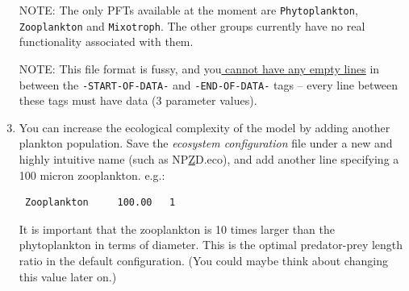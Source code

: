 \begin{enumerate}[noitemsep]
\newpage

\noindent \textsf{\footnotesize NPD.eco} note that only the lines in between the \texttt{\small -START-OF-DATA-} and \texttt{\small -END-OF-DATA-} tags are read by the computer. The rest is there solely for your guidance.

\vspace{1mm}
Each line that is entered in the computer-readable area tells the model to create a distinct plankton population in the model. The 'plankton functional type' of this population is specified in the first column, while the plankton diameter is specified in the second column. A '\texttt{1}' must always be placed in the third column\footnote{It doesn't 'do' anything, but the model still needs it ...  why ... WTF?}.

\vspace{1mm}
In this 'NPD' (single nutrient-plankton-detritus) configuration, we only have a 10 micron generic phytoplankton. The ecological and physiological traits of this population are assigned automatically according to the size and the functional type (here: photo-autotroph).

\vspace{1mm}
\item[NOTE:] The only PFTs available at the moment are \texttt{Phytoplankton}, \texttt{Zooplankton} and \texttt{Mixotroph}. The other groups currently have no real functionality associated with them.

\vspace{1mm}
\item[NOTE:] This file format is fussy, and you\uline{ cannot have any empty lines} in between the  \texttt{\small -START-OF-DATA-} and \texttt{\small -END-OF-DATA-} tags -- every line between these tags must have data (3 parameter values).

\vspace{2mm}
\item You can increase the ecological complexity of the model by adding another plankton population. Save the \textit{ecosystem configuration} file under a new and highly intuitive name (such as \textsf{\footnotesize NP\underline{Z}D.eco}), and add another line specifying a 100 micron zooplankton. e.g.:
\small\begin{verbatim}
 Zooplankton     100.00   1
\end{verbatim}\normalsize
It is important that the zooplankton is 10 times larger than the phytoplankton in terms of diameter. This is the optimal predator-prey length ratio in the default configuration. (You could maybe think about changing this value later on.)


\end{enumerate}
